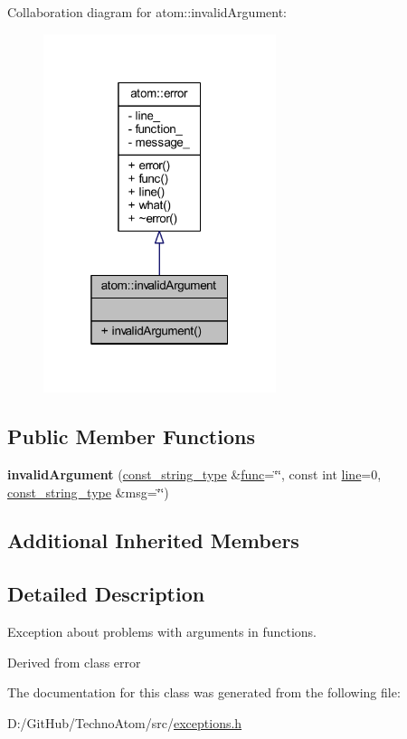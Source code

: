 Collaboration diagram for atom\+:\+:invalid\+Argument\+:
\nopagebreak
\begin{figure}[H]
\begin{center}
\leavevmode
\includegraphics[width=193pt]{classatom_1_1invalid_argument__coll__graph}
\end{center}
\end{figure}
\subsection*{Public Member Functions}
\begin{DoxyCompactItemize}
\item 
\mbox{\label{classatom_1_1invalid_argument_a21255e405e4aa56098092b4ac75d53e4}} 
{\bfseries invalid\+Argument} (\hyperlink{classatom_1_1error_ac330e9fb7cedcf4a173c5eb156d7bdaf}{const\+\_\+string\+\_\+type} \&\hyperlink{classatom_1_1error_a0a70a92b1638bfe4be7972651ae0c5c8}{func}=\char`\"{}\char`\"{}, const int \hyperlink{classatom_1_1error_aa9443d1a458d0dc6086372444a58e8c6}{line}=0, \hyperlink{classatom_1_1error_ac330e9fb7cedcf4a173c5eb156d7bdaf}{const\+\_\+string\+\_\+type} \&msg=\char`\"{}\char`\"{})
\end{DoxyCompactItemize}
\subsection*{Additional Inherited Members}


\subsection{Detailed Description}
Exception about problems with arguments in functions. 

Derived from class error 

The documentation for this class was generated from the following file\+:\begin{DoxyCompactItemize}
\item 
D\+:/\+Git\+Hub/\+Techno\+Atom/src/\hyperlink{exceptions_8h}{exceptions.\+h}\end{DoxyCompactItemize}
